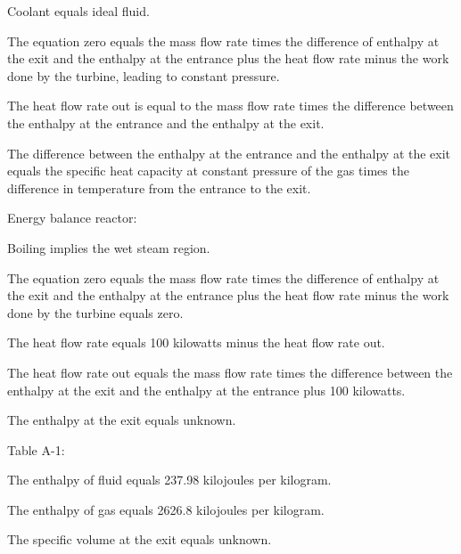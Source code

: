 Coolant equals ideal fluid.

The equation zero equals the mass flow rate times the difference of enthalpy at the exit and the enthalpy at the entrance plus the heat flow rate minus the work done by the turbine, leading to constant pressure.

The heat flow rate out is equal to the mass flow rate times the difference between the enthalpy at the entrance and the enthalpy at the exit.

The difference between the enthalpy at the entrance and the enthalpy at the exit equals the specific heat capacity at constant pressure of the gas times the difference in temperature from the entrance to the exit.

Energy balance reactor:

Boiling implies the wet steam region.

The equation zero equals the mass flow rate times the difference of enthalpy at the exit and the enthalpy at the entrance plus the heat flow rate minus the work done by the turbine equals zero.

The heat flow rate equals 100 kilowatts minus the heat flow rate out.

The heat flow rate out equals the mass flow rate times the difference between the enthalpy at the exit and the enthalpy at the entrance plus 100 kilowatts.

The enthalpy at the exit equals unknown.

Table A-1:

The enthalpy of fluid equals 237.98 kilojoules per kilogram.

The enthalpy of gas equals 2626.8 kilojoules per kilogram.

The specific volume at the exit equals unknown.